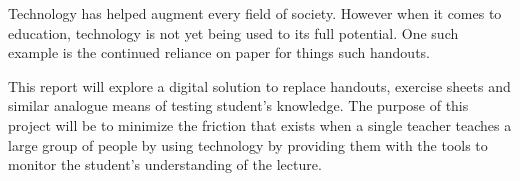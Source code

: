 Technology has helped augment every field of society. However when it comes to education, technology is not yet being used to its full potential. One such example is the continued reliance on paper for things such handouts.

This report will explore a digital solution to replace handouts, exercise sheets and similar analogue means of testing student's knowledge. The purpose of this project will be to minimize the friction that exists when a single teacher teaches a large group of people by using technology by providing them with the tools to monitor the student's understanding of the lecture.